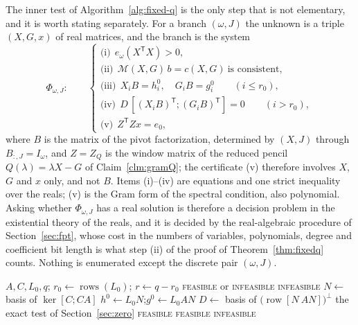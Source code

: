 \documentclass[journal]{IEEEtran}
\theoremstyle{plainn}
\theoremstyle{remark}
\begin{document}
The inner test of Algorithm~\ref{alg:fixed-q} is the only step that is not
elementary, and it is worth stating separately. For a branch $(\omega,J)$ the unknown is a triple
$(X,G,x)$ of real matrices, and the branch is the system
\begin{equation}\label{eq:phi}
\Phi_{\omega,J}:\qquad
\begin{cases}
\text{(i)}\ \ e_\omega(X^{\mathsf T}X)>0,\\
\text{(ii)}\ \ \mathcal M(X,G)\,b=c(X,G)\ \text{is consistent},\\
\text{(iii)}\ \ X_iB=h_i^0,\quad G_iB=g_i^0\qquad(i\le r_0),\\
\text{(iv)}\ \ D\,[(X_iB)^{\mathsf T};(G_iB)^{\mathsf T}]=0\qquad(i>r_0),\\
\text{(v)}\ \ Z^{\mathsf T}Zx=e_0,
\end{cases}
\end{equation}
where $B$ is the matrix of the pivot factorization, determined by $(X,J)$ through $B_{:,J}=I_\omega$,
and $Z=Z_Q$ is the window matrix of the reduced pencil $Q(\lambda)=\lambda X-G$ of
Claim~\ref{clm:gramQ}; the certificate (v) therefore involves $X$, $G$ and $x$ only, and not $B$. Items
(i)--(iv) are equations and one strict
inequality over the reals; (v) is the Gram form of the spectral condition, also polynomial. Asking
whether $\Phi_{\omega,J}$ has a real solution is therefore a decision problem in the existential theory
of the reals, and it is decided by the real-algebraic procedure of Section~\ref{sec:fpt}, whose cost
in the numbers of variables, polynomials, degree and coefficient bit length is what step (ii) of the
proof of Theorem~\ref{thm:fixedq} counts. Nothing is enumerated except the discrete pair $(\omega,J)$.

\begin{algorithm}[!t]
\caption{Deciding $\mathrm{DEC}(q)$ for a fixed order $q$}
\label{alg:fixed-q}
\begin{algorithmic}[1]
\Require $A,C,L_0,q$; \quad $r_0\gets\operatorname{rows}(L_0)$; \quad $r\gets q-r_0$
\Ensure \textsc{feasible} or \textsc{infeasible}
  \State \Return \textsc{infeasible}
  \Statex {}
\EndIf
\State $N\gets$ basis of $\ker[C;CA]$
\State $h^0\gets L_0N$;\quad $g^0\gets L_0AN$
\State $D\gets$ basis of $\bigl(\operatorname{row}[N\ AN]\bigr)^{\perp}$
  \State \Return the exact test of Section~\ref{sec:zero}
\EndIf
{}
  \State \Return \textsc{feasible}
  \Statex {}
\EndIf
{}
      \State \Return \textsc{feasible}
    \EndIf
  \EndFor
\EndFor
\State \Return \textsc{infeasible}
\end{algorithmic}
\end{algorithm}
\end{document}
